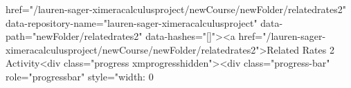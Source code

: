 href="/lauren-sager-ximeracalculusproject/newCourse/newFolder/relatedrates2" data-repository-name="lauren-sager-ximeracalculusproject" data-path="newFolder/relatedrates2" data-hashes="[]"><a href="/lauren-sager-ximeracalculusproject/newCourse/newFolder/relatedrates2">Related Rates 2 Activity<div class="progress xmprogresshidden"><div class="progress-bar" role="progressbar" style="width: 0%